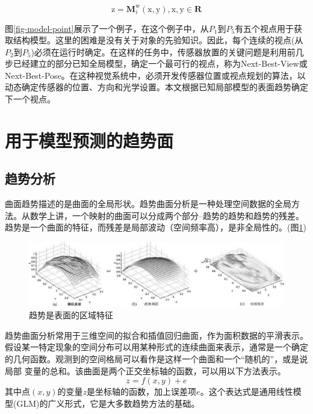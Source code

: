 \documentclass[AutoFakeBold,zihao=-4]{ctexart}
\begin{document}
	\begin{equation}
		\mathrm{z}=\boldsymbol{M}_{i}^{\mathrm{w}}(\mathrm{x}, \mathrm{y}), \mathrm{x}, \mathrm{y} \in \mathbf{R}
		\label{eq2}
	\end{equation}

	图\ref{fig-model-point}展示了一个例子，在这个例子中，从$ P_{1} $到$ P_{5} $有五个视点用于获取结构模型。这里的困难是没有关于对象的先验知识。因此，每个连续的视点(从$ P_{2} $到$ P_{5} $)必须在运行时确定。在这样的任务中，传感器放置的关键问题是利用前几步已经建立的部分已知全局模型，确定一个最可行的视点，称为Next-Best-View或Next-Best-Pose\cite{zha1997active}。在这种视觉系统中，必须开发传感器位置或视点规划的算法，以动态确定传感器的位置、方向和光学设置。本文根据已知局部模型的表面趋势确定下一个视点。
	
	\section{用于模型预测的趋势面}
	\subsection{趋势分析}
	曲面趋势描述的是曲面的全局形状。趋势曲面分析是一种处理空间数据的全局方法。从数学上讲，一个映射的曲面可以分成两个部分--趋势的趋势和趋势的残差。趋势是一个曲面的特征，而残差是局部波动（空间频率高），是非全局性的。(图\ref{fig-trend})
	
	\begin{figure}[h]
		\centering
		\includegraphics[scale=0.5]{PIC2}
		\caption{ 趋势是表面的区域特征}
		\label{fig-trend}
	\end{figure}

	趋势曲面分析常用于三维空间的拟合和插值回归曲面，作为面积数据的平滑表示。假设某一特定现象的空间分布可以用某种形式的连续曲面来表示，通常是一个确定的几何函数。观测到的空间格局可以看作是这样一个曲面和一个“随机的”，或是说局部 变量的总和。该曲面是两个正交坐标轴的函数，可以用以下方法表示。
	\begin{equation}
		z=f(x, y)+e
		\label{eq3}
	\end{equation}
	其中点$ (x,y) $的变量$ z $是坐标轴的函数，加上误差项$ e $。这个表达式是通用线性模型(GLM)的广义形式，它是大多数趋势方法的基础。
	
\end{document}
